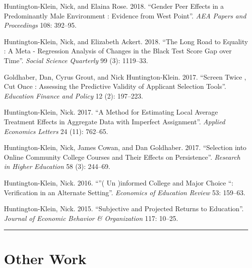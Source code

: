 \documentclass[11pt,a4paper]{article}
\begin{document}
\begin{hangparas}{.25in}{1}

Huntington-Klein, Nick, and Elaina Rose. 2018. ``Gender Peer Effects in a Predominantly Male Environment : Evidence from West Point''. \emph{AEA Papers and Proceedings} 108: 392--95.



Huntington-Klein, Nick, and Elizabeth Ackert. 2018. ``The Long Road to Equality : A Meta - Regression Analysis of Changes in the Black Test Score Gap over Time''. \emph{Social Science Quarterly} 99 (3): 1119--33.



Goldhaber, Dan, Cyrus Grout, and Nick Huntington-Klein. 2017. ``Screen Twice , Cut Once : Assessing the Predictive Validity of Applicant Selection Tools''. \emph{Education Finance and Policy} 12 (2): 197--223.



Huntington-Klein, Nick. 2017. ``A Method for Estimating Local Average Treatment Effects in Aggregate Data with Imperfect Assignment''. \emph{Applied Economics Letters} 24 (11): 762--65.



Huntington-Klein, Nick, James Cowan, and Dan Goldhaber. 2017. ``Selection into Online Community College Courses and Their Effects on Persistence''. \emph{Research in Higher Education} 58 (3): 244--69.



Huntington-Klein, Nick. 2016. ``''( Un )informed College and Major Choice ``: Verification in an Alternate Setting''. \emph{Economics of Education Review} 53: 159--63.



Huntington-Klein, Nick. 2015. ``Subjective and Projected Returns to Education''. \emph{Journal of Economic Behavior \& Organization} 117: 10--25.

 

\end{hangparas}

\vspace{1cm} \hrule \vspace{1cm}





\section*{Other Work} 
\end{document}
